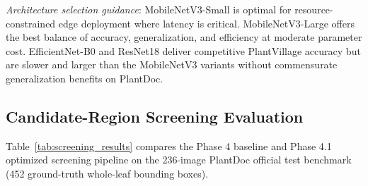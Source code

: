 \documentclass[pdflatex,sn-mathphys-num]{sn-jnl}
\theoremstyle{thmstyleone}%
\theoremstyle{thmstyletwo}%
\theoremstyle{thmstylethree}%
\begin{document}
\begin{table}[htbp]
\centering
\caption{Comprehensive architecture benchmark: in-domain classification, out-of-domain generalization, calibration, and computational efficiency. Single-image inference is measured over 100 runs on an AMD Ryzen 7 5800HS CPU (8 threads). Full screening pipeline latency encompasses foliar ExG filtering, multi-crop generation, batch inference, and hybrid NMS over 50 PlantDoc images.}\label{tab:full_comparison}
\end{table}

\textit{Architecture selection guidance}: MobileNetV3-Small is optimal for
resource-constrained edge deployment where latency is critical. MobileNetV3-Large
offers the best balance of accuracy, generalization, and efficiency at moderate
parameter cost. EfficientNet-B0 and ResNet18 deliver competitive PlantVillage accuracy
but are slower and larger than the MobileNetV3 variants without commensurate
generalization benefits on PlantDoc.

\subsection{Candidate-Region Screening Evaluation}
\label{sec:results_screening}

Table~\ref{tab:screening_results} compares the Phase 4 baseline and Phase 4.1 optimized
screening pipeline on the 236-image PlantDoc official test benchmark (452 ground-truth
whole-leaf bounding boxes).
\end{document}

